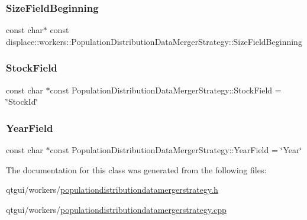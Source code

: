 \subsubsection{\texorpdfstring{SizeFieldBeginning}{SizeFieldBeginning}}
{\footnotesize\ttfamily const char$\ast$ const displace\+::workers\+::\+Population\+Distribution\+Data\+Merger\+Strategy\+::\+Size\+Field\+Beginning\hspace{0.3cm}{\ttfamily [static]}}

\mbox{\label{classdisplace_1_1workers_1_1_population_distribution_data_merger_strategy_a10f1aed9f287d21b82aa9d954a94173c}} 
\subsubsection{\texorpdfstring{StockField}{StockField}}
{\footnotesize\ttfamily const char $\ast$const Population\+Distribution\+Data\+Merger\+Strategy\+::\+Stock\+Field = \char`\"{}Stock\+Id\char`\"{}\hspace{0.3cm}{\ttfamily [static]}}

\mbox{\label{classdisplace_1_1workers_1_1_population_distribution_data_merger_strategy_a37c7981669f8d80aca2753b2ea4e2937}} 
\subsubsection{\texorpdfstring{YearField}{YearField}}
{\footnotesize\ttfamily const char $\ast$const Population\+Distribution\+Data\+Merger\+Strategy\+::\+Year\+Field = \char`\"{}Year\char`\"{}\hspace{0.3cm}{\ttfamily [static]}}



The documentation for this class was generated from the following files\+:\begin{DoxyCompactItemize}
\item 
qtgui/workers/\mbox{\hyperlink{populationdistributiondatamergerstrategy_8h}{populationdistributiondatamergerstrategy.\+h}}\item 
qtgui/workers/\mbox{\hyperlink{populationdistributiondatamergerstrategy_8cpp}{populationdistributiondatamergerstrategy.\+cpp}}\end{DoxyCompactItemize}
